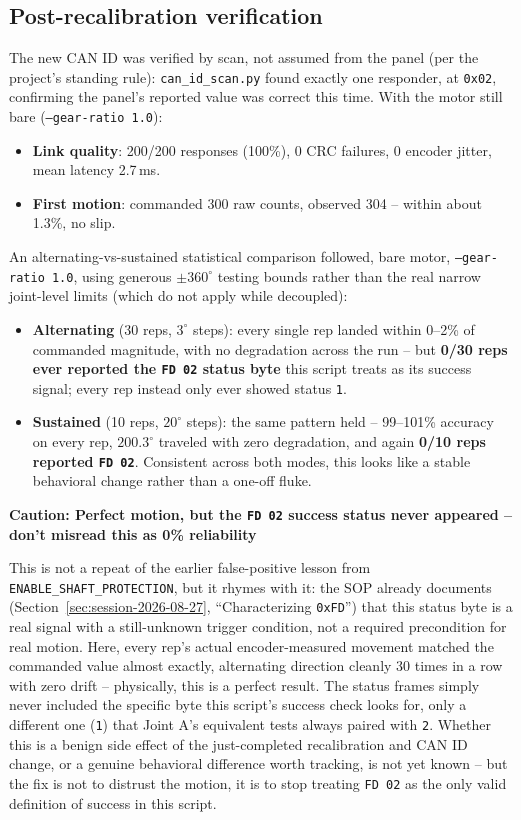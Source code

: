 \documentclass[11pt,letterpaper]{article}
\newenvironment{caution}[1]{%
    \par\addvspace{8pt}%
    \noindent{\color{cautionred}\rule{\linewidth}{0.8pt}}\par\vspace{2pt}
    \noindent\textbf{\color{cautionred}Caution: #1}\par\vspace{2pt}
}{%
    \par\vspace{2pt}\noindent{\color{cautionred}\rule{\linewidth}{0.4pt}}%
    \par\addvspace{8pt}%
}
\begin{document}
\subsection{Post-recalibration verification}
The new CAN ID was verified by scan, not assumed from the panel (per the project's standing rule): \texttt{can\_id\_scan.py} found exactly one responder, at \texttt{0x02}, confirming the panel's reported value was correct this time. With the motor still bare (\texttt{--gear-ratio 1.0}):
\begin{itemize}
    \item \textbf{Link quality}: 200/200 responses (100\%), 0 CRC failures, 0 encoder jitter, mean latency 2.7\,ms.
    \item \textbf{First motion}: commanded 300 raw counts, observed 304 -- within about 1.3\%, no slip.
\end{itemize}
An alternating-vs-sustained statistical comparison followed, bare motor, \texttt{--gear-ratio 1.0}, using generous $\pm 360^\circ$ testing bounds rather than the real narrow joint-level limits (which do not apply while decoupled):
\begin{itemize}
    \item \textbf{Alternating} (30 reps, $3^\circ$ steps): every single rep landed within 0--2\% of commanded magnitude, with no degradation across the run -- but \textbf{0/30 reps ever reported the \texttt{FD 02} status byte} this script treats as its success signal; every rep instead only ever showed status \texttt{1}.
    \item \textbf{Sustained} (10 reps, $20^\circ$ steps): the same pattern held -- 99--101\% accuracy on every rep, $200.3^\circ$ traveled with zero degradation, and again \textbf{0/10 reps reported \texttt{FD 02}}. Consistent across both modes, this looks like a stable behavioral change rather than a one-off fluke.
\end{itemize}

\begin{caution}{Perfect motion, but the \texttt{FD 02} success status never appeared -- don't misread this as 0\% reliability}
This is not a repeat of the earlier false-positive lesson from \texttt{ENABLE\_SHAFT\_PROTECTION}, but it rhymes with it: the SOP already documents (Section~\ref{sec:session-2026-08-27}, ``Characterizing \texttt{0xFD}'') that this status byte is a real signal with a still-unknown trigger condition, not a required precondition for real motion. Here, every rep's actual encoder-measured movement matched the commanded value almost exactly, alternating direction cleanly 30 times in a row with zero drift -- physically, this is a perfect result. The status frames simply never included the specific byte this script's success check looks for, only a different one (\texttt{1}) that Joint A's equivalent tests always paired with \texttt{2}. Whether this is a benign side effect of the just-completed recalibration and CAN ID change, or a genuine behavioral difference worth tracking, is not yet known -- but the fix is not to distrust the motion, it is to stop treating \texttt{FD 02} as the only valid definition of success in this script.
\end{caution}
\end{document}
